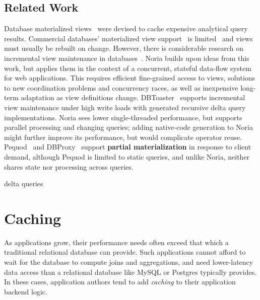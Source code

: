 \subsection{Related Work}

\resume

%
Database materialized views~\cite{gupta-view-selection,lee} were devised to
cache expensive analytical query results.
%
Commercial databases' materialized view
support~\cite{materialized-view-selection-sql-server} is
limited~\cite{mssql-materialized-view-restrictions-blog,
mssql-materialized-view-restrictions} and views must usually be rebuilt on
change.
%
However, there is considerable research on incremental view maintenance in
databases~\cite{tompa, zhou2, zhuge, gupta, larson, lee}.
%
Noria builds upon ideas from this work, but applies them in the context of a
concurrent, stateful data-flow system for web applications.
%
This requires efficient fine-grained access to views, solutions to new
coordination problems and concurrency races, as well as inexpensive long-term
adaptation as view definitions change.
%
DBToaster~\cite{dbtoaster, hotdog} supports incremental view maintenance
under high write loads with generated recursive delta query implementations.
%
Noria sees lower single-threaded performance, but supports parallel processing
and changing queries; adding native-code generation to Noria might further
improve its performance, but would complicate operator reuse.
%
Pequod~\cite{pequod} and DBProxy~\cite{dbproxy} support \textbf{partial
materialization} in response to client demand, although Pequod is limited to
static queries, and unlike Noria, neither shares state nor processing across
queries.
%

delta queries

%
%


\section{Caching}

As applications grow, their performance needs often exceed that which a
traditional relational database can provide. Such applications cannot afford to
wait for the database to compute joins and aggregations, and need lower-latency
data access than a relational database like MySQL or Postgres typically
provides. In these cases, application authors tend to add \textit{caching} to
their application backend logic.

